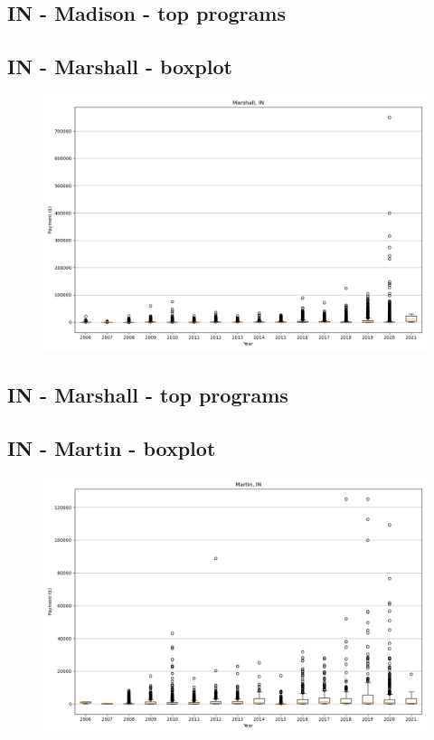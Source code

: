 \subsection*{IN - Madison - top programs}

\newpage
\subsection*{IN - Marshall - boxplot}
\begin{figure}[h]
\centering
\includegraphics[width=7in]{../output/boxplots/counties/Marshall-IN_boxplot.png}
\end{figure}


\subsection*{IN - Marshall - top programs}

\newpage
\subsection*{IN - Martin - boxplot}
\begin{figure}[h]
\centering
\includegraphics[width=7in]{../output/boxplots/counties/Martin-IN_boxplot.png}
\end{figure}



